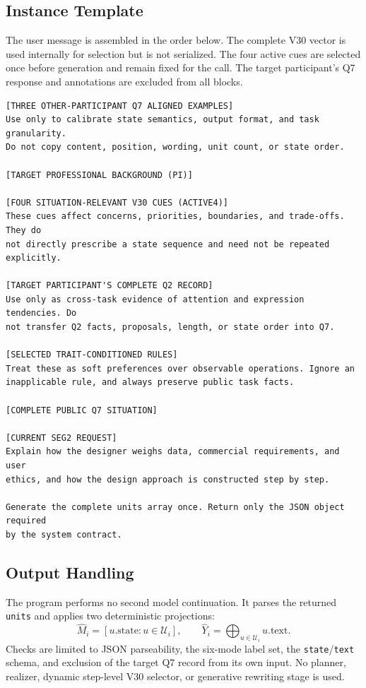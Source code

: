 \subsection{Instance Template}

The user message is assembled in the order below. The complete V30 vector is
used internally for selection but is not serialized. The four active cues are
selected once before generation and remain fixed for the call. The target
participant's Q7 response and annotations are excluded from all blocks.

\begin{lstlisting}[style=promptstyle,
caption={One-call instance template.},
label={lst:onecall_user}]
[THREE OTHER-PARTICIPANT Q7 ALIGNED EXAMPLES]
Use only to calibrate state semantics, output format, and task granularity.
Do not copy content, position, wording, unit count, or state order.

[TARGET PROFESSIONAL BACKGROUND (PI)]

[FOUR SITUATION-RELEVANT V30 CUES (ACTIVE4)]
These cues affect concerns, priorities, boundaries, and trade-offs. They do
not directly prescribe a state sequence and need not be repeated explicitly.

[TARGET PARTICIPANT'S COMPLETE Q2 RECORD]
Use only as cross-task evidence of attention and expression tendencies. Do
not transfer Q2 facts, proposals, length, or state order into Q7.

[SELECTED TRAIT-CONDITIONED RULES]
Treat these as soft preferences over observable operations. Ignore an
inapplicable rule, and always preserve public task facts.

[COMPLETE PUBLIC Q7 SITUATION]

[CURRENT SEG2 REQUEST]
Explain how the designer weighs data, commercial requirements, and user
ethics, and how the design approach is constructed step by step.

Generate the complete units array once. Return only the JSON object required
by the system contract.
\end{lstlisting}

\subsection{Output Handling}

The program performs no second model continuation. It parses the returned
\texttt{units} and applies two deterministic projections:
\begin{equation}
\hat M_i=[u.\mathrm{state}:u\in\mathcal U_i],
\qquad
\hat Y_i=\bigoplus_{u\in\mathcal U_i}u.\mathrm{text}.
\end{equation}
Checks are limited to JSON parseability, the six-mode label set, the
\texttt{state}/\texttt{text} schema, and exclusion of the target Q7 record
from its own input. No planner, realizer, dynamic step-level V30 selector, or
generative rewriting stage is used.
